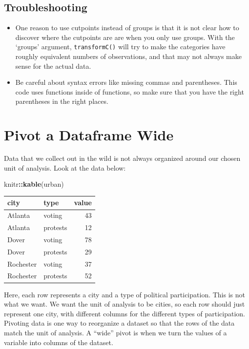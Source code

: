 \documentclass[
]{book}
\newenvironment{Shaded}{\begin{snugshade}}{\end{snugshade}}
\newcommand{\FunctionTok}[1]{\textcolor[rgb]{0.13,0.29,0.53}{\textbf{#1}}}
\newcommand{\NormalTok}[1]{#1}
\newcommand{\SpecialCharTok}[1]{\textcolor[rgb]{0.81,0.36,0.00}{\textbf{#1}}}
\begin{document}
\hypertarget{troubleshooting-21}{%
\subsection{Troubleshooting}\label{troubleshooting-21}}

\begin{itemize}
\item
  One reason to use cutpoints instead of groups is that it is not clear how to discover where the cutpoints are are when you only use groups. With the `groups' argument, \texttt{transformC()} will try to make the categories have roughly equivalent numbers of observations, and that may not always make sense for the actual data.
\item
  Be careful about syntax errors like missing commas and parentheses. This code uses functions inside of functions, so make sure that you have the right parentheses in the right places.
\end{itemize}

\hypertarget{pivot_wide}{%
\section{Pivot a Dataframe Wide}\label{pivot_wide}}

Data that we collect out in the wild is not always organized around our chosen unit of analysis. Look at the data below:

\begin{Shaded}
\begin{Highlighting}[]
\NormalTok{knitr}\SpecialCharTok{::}\FunctionTok{kable}\NormalTok{(urban)}
\end{Highlighting}
\end{Shaded}

\begin{tabular}{l|l|r}
\hline
city & type & value\\
\hline
Atlanta & voting & 43\\
\hline
Atlanta & protests & 12\\
\hline
Dover & voting & 78\\
\hline
Dover & protests & 29\\
\hline
Rochester & voting & 37\\
\hline
Rochester & protests & 52\\
\hline
\end{tabular}

Here, each row represents a city and a type of political participation. This is not what we want. We want the unit of analysis to be cities, so each row should just represent one city, with different columns for the different types of participation. Pivoting data is one way to reorganize a dataset so that the rows of the data match the unit of analysis. A ``wide'' pivot is when we turn the values of a variable into columns of the dataset.
\end{document}
